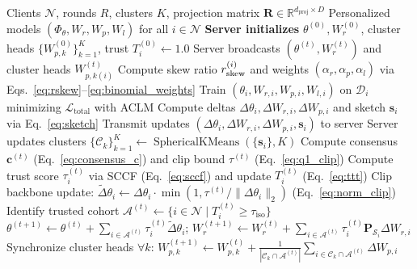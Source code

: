 \begin{algorithm}[t]
\caption{\fedhep{} Client Training and Server Aggregation}
\label{alg:fedhep}
\footnotesize
\begin{algorithmic}[1]
\Require Clients $\mathcal{N}$, rounds $R$, clusters $K$, projection matrix $\mathbf{R} \in \mathbb{R}^{d_{\mathrm{proj}} \times D}$
\Ensure Personalized models $(\Phi_\theta, W_r, W_p, W_l)$ for all $i \in \mathcal{N}$
\State \textbf{Server initializes} $\theta^{(0)}, W_r^{(0)}$, cluster heads $\{W_{p,k}^{(0)}\}_{k=1}^K$, trust $T_i^{(0)} \leftarrow 1.0$
  \State Server broadcasts $(\theta^{(t)}, W_r^{(t)})$ and cluster heads $W_{p, k(i)}^{(t)}$
   
    \State Compute skew ratio $r_{\mathrm{skew}}^{(i)}$ and weights $(\alpha_r, \alpha_p, \alpha_l)$ via Eqs.~\eqref{eq:rskew}--\eqref{eq:binomial_weights}
    \State Train $(\theta_i, W_{r,i}, W_{p,i}, W_{l,i})$ on $\mathcal{D}_i$ minimizing $\mathcal{L}_{\mathrm{total}}$ with ACLM
    \State Compute deltas $\Delta \theta_i, \Delta W_{r,i}, \Delta W_{p,i}$ and sketch $\mathbf{s}_i$ via Eq.~\eqref{eq:sketch}
    \State Transmit updates $(\Delta \theta_i, \Delta W_{r,i}, \Delta W_{p,i}, \mathbf{s}_i)$ to server
  \EndFor
  \State Server updates clusters $\{\mathcal{C}_k\}_{k=1}^K \leftarrow \operatorname{SphericalKMeans}(\{\mathbf{s}_i\}, K)$
  \State Compute consensus $\mathbf{c}^{(t)}$ (Eq.~\eqref{eq:consensus_c}) and clip bound $\tau^{(t)}$ (Eq.~\eqref{eq:q1_clip})
   
    \State Compute trust score $\tau_i^{(t)}$ via SCCF (Eq.~\eqref{eq:sccf}) and update $T_i^{(t)}$ (Eq.~\eqref{eq:ttt})
    \State Clip backbone update: $\tilde{\Delta} \theta_i \leftarrow \Delta \theta_i \cdot \min(1, \tau^{(t)} / \|\Delta \theta_i\|_2)$ (Eq.~\eqref{eq:norm_clip})
  \EndFor
  \State Identify trusted cohort $\mathcal{A}^{(t)} \leftarrow \{i \in \mathcal{N} \mid T_i^{(t)} \ge \tau_{\mathrm{iso}}\}$
  \State $\theta^{(t+1)} \leftarrow \theta^{(t)} + \sum_{i \in \mathcal{A}^{(t)}} \tau_i^{(t)} \tilde{\Delta} \theta_i$; \quad $W_r^{(t+1)} \leftarrow W_r^{(t)} + \sum_{i \in \mathcal{A}^{(t)}} \tau_i^{(t)} \mathbf{P}_{\mathcal{S}_i} \Delta W_{r,i}$
  \State Synchronize cluster heads $\forall k$: $W_{p,k}^{(t+1)} \leftarrow W_{p,k}^{(t)} + \frac{1}{|\mathcal{C}_k \cap \mathcal{A}^{(t)}|} \sum_{i \in \mathcal{C}_k \cap \mathcal{A}^{(t)}} \Delta W_{p,i}$
\EndFor
\end{algorithmic}
\end{algorithm}
